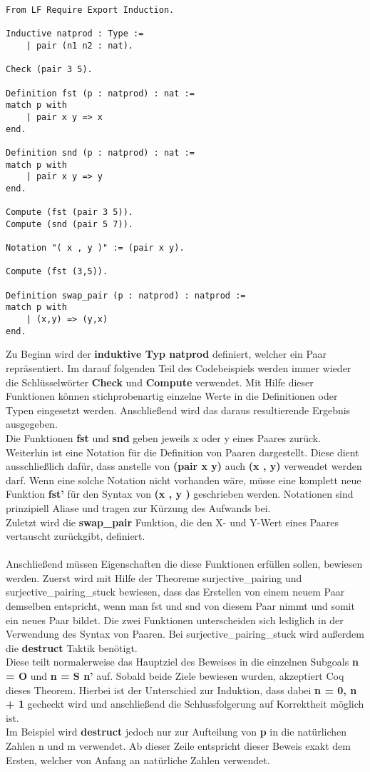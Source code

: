 \begin{lstlisting}[language=coq,firstnumber=1,caption=Coq Funktionen für Paare aus natürlichen Zahlen,label=lst:practical-functions]
From LF Require Export Induction.

Inductive natprod : Type :=
	| pair (n1 n2 : nat).

Check (pair 3 5).

Definition fst (p : natprod) : nat :=
match p with
	| pair x y => x
end.

Definition snd (p : natprod) : nat :=
match p with
	| pair x y => y
end.

Compute (fst (pair 3 5)).
Compute (snd (pair 5 7)).

Notation "( x , y )" := (pair x y).

Compute (fst (3,5)).

Definition swap_pair (p : natprod) : natprod :=
match p with
	| (x,y) => (y,x)
end.
\end{lstlisting}
Zu Beginn wird der \textbf{induktive Typ natprod} definiert, welcher ein Paar repräsentiert. Im darauf folgenden Teil des Codebeispiels werden immer wieder die Schlüsselwörter \textbf{Check} und \textbf{Compute} verwendet. Mit Hilfe dieser Funktionen können stichprobenartig einzelne Werte in die Definitionen oder Typen eingesetzt werden. Anschließend wird das daraus resultierende Ergebnis ausgegeben.\\
Die Funktionen \textbf{fst} und \textbf{snd} geben jeweils x oder y eines Paares zurück. Weiterhin ist eine Notation für die Definition von Paaren dargestellt. Diese dient ausschließlich dafür, dass anstelle von 
\textbf{(pair x y)} auch \textbf{(x , y)} verwendet werden darf. Wenn eine solche Notation nicht vorhanden wäre, müsse eine komplett neue Funktion \textbf{fst'} für den Syntax von \textbf{(x , y )} geschrieben werden. Notationen sind prinzipiell Aliase und tragen zur Kürzung des Aufwands bei.\\
Zuletzt wird die \textbf{swap\_pair} Funktion, die den X- und Y-Wert eines Paares vertauscht zurückgibt, definiert.\\
\\
Anschließend müssen Eigenschaften die diese Funktionen erfüllen sollen, bewiesen werden.
Zuerst wird mit Hilfe der Theoreme surjective\_pairing und surjective\_pairing\_stuck bewiesen, dass das Erstellen von einem neuem Paar demselben entspricht, wenn man fst und snd von diesem Paar nimmt und somit ein neues Paar bildet. Die zwei Funktionen unterscheiden sich lediglich in der Verwendung des Syntax von Paaren. Bei surjective\_pairing\_stuck wird außerdem die \textbf{destruct} Taktik benötigt.\\
Diese teilt normalerweise das Hauptziel des Beweises in die einzelnen Subgoals \textbf{n = O} und \textbf{n = S n'} auf. Sobald beide Ziele bewiesen wurden, akzeptiert Coq dieses Theorem. Hierbei ist der Unterschied zur Induktion, dass dabei \textbf{n = 0, n + 1} gecheckt wird und anschließend die Schlussfolgerung auf Korrektheit möglich ist.\\
Im Beispiel wird \textbf{destruct} jedoch nur zur Aufteilung von \textbf{p} in die natürlichen Zahlen n und m verwendet.
Ab dieser Zeile entspricht dieser Beweis exakt dem Ersten, welcher von Anfang an natürliche Zahlen verwendet. 

